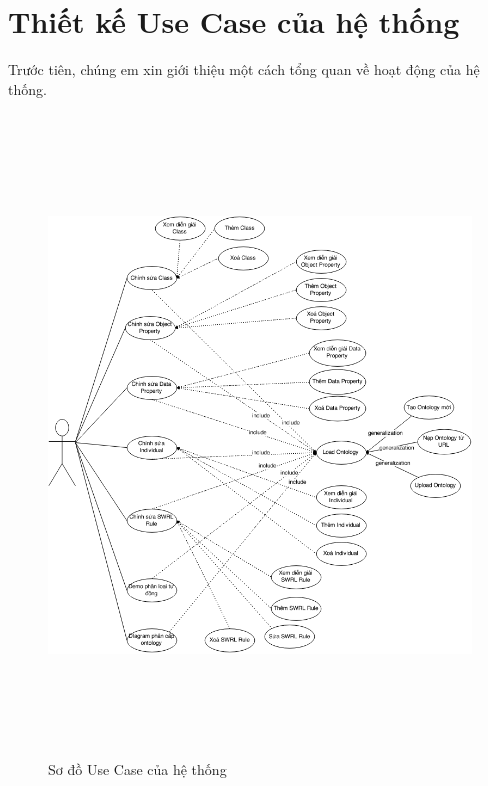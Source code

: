\section{Thiết kế Use Case của hệ thống}
Trước tiên, chúng em xin giới thiệu một cách tổng quan về hoạt động của hệ thống.
 \begin{figure}[ht!]
 	\centering
 	\includegraphics[width=155mm,height=170mm]{Figures/usecase.png}
 	\caption{Sơ đồ Use Case của hệ thống \label{overflow}}
 \end{figure}
